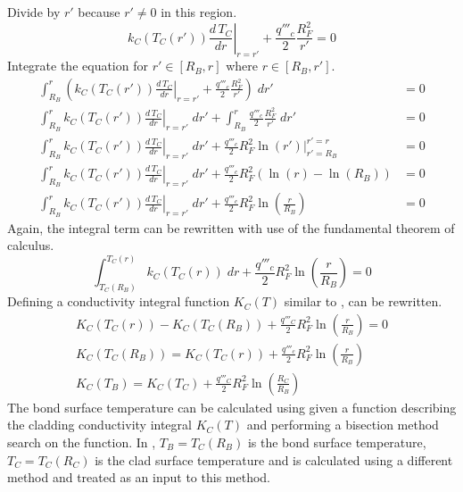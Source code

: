       Divide by $r'$ because $r' \ne 0$ in this region.
      \begin{equation}
        \left. k_C(T_C(r')) \frac{d\,T_C}{dr} \right|_{r=r'} + 
          \frac{q'''_c}{2} \frac{R_F^2}{r'} = 0
      \end{equation}
      Integrate the equation for $r' \in [R_B,r]$ where $r \in [R_B,r']$.
      \begin{align}
        \int_{R_B}^r \left( \left. k_C(T_C(r')) \frac{d\,T_C}{dr} \right|_{r=r'}
          + \frac{q'''_c}{2} \frac{R_F^2}{r'} \right) \; dr' &= 0 \\
        \int_{R_B}^r \left. k_C(T_C(r')) \frac{d\,T_C}{dr} \right|_{r=r'} \; dr'
          + \int_{R_B}^r \frac{q'''_c}{2} \frac{R_F^2}{r'} \; dr' &= 0 \\
        \int_{R_B}^r \left. k_C(T_C(r')) \frac{d\,T_C}{dr} \right|_{r=r'} \; dr'
          + \frac{q'''_c}{2} R_F^2 \left. \ln(r') \right|_{r'=R_B}^{r'=r} &= 0\\
        \int_{R_B}^r \left. k_C(T_C(r')) \frac{d\,T_C}{dr} \right|_{r=r'} \; dr'
          + \frac{q'''_c}{2} R_F^2 (\ln(r) - \ln(R_B)) &= 0\\
        \int_{R_B}^r \left. k_C(T_C(r')) \frac{d\,T_C}{dr} \right|_{r=r'} \; dr'
          + \frac{q'''_c}{2} R_F^2 \ln\left(\frac{r}{R_B}\right) &= 0
      \end{align}
      Again, the integral term can be rewritten with use of the fundamental
      theorem of calculus.
      \begin{equation}
        \label{eq:clad_integral}
        \int_{T_C(R_B)}^{T_C(r)} k_C(T_C(r)) \; dr +
          \frac{q'''_c}{2} R_F^2 \ln\left(\frac{r}{R_B}\right) = 0
      \end{equation}
      Defining a conductivity integral function $K_C(T)$ similar to
      ,  can be rewritten.
      \begin{gather}
        K_C(T_C(r)) - K_C(T_C(R_B)) + \frac{q'''_C}{2} R_F^2
          \ln\left(\frac{r}{R_B}\right) = 0 \\
        \label{eq:tclad_r}
        K_C(T_C(R_B)) = K_C(T_C(r)) + \frac{q'''_c}{2} R_F^2
          \ln\left(\frac{r}{R_B}\right) \\
        \label{eq:ktb}
        K_C(T_B) = K_C(T_C) + \frac{q'''_C}{2} R_F^2
          \ln\left(\frac{R_C}{R_B}\right) 
      \end{gather}
      The bond surface temperature can be calculated using  given a
      function describing the cladding conductivity integral $K_C(T)$ and
      performing a bisection method search on the function. In ,
      $T_B = T_C(R_B)$ is the bond surface temperature, $T_C=T_C(R_C)$ is the
      clad surface temperature and is calculated using a different method and
      treated as an input to this method.  

